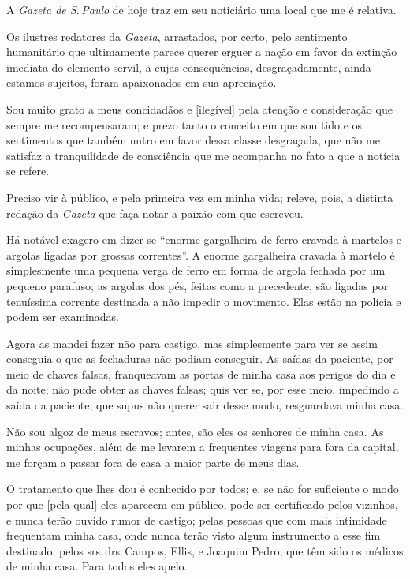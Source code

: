 {A \emph{Gazeta de S.\,Paulo} de hoje traz em seu noticiário uma local que
me é relativa.

Os ilustres redatores da \emph{Gazeta}, arrastados, por certo, pelo
sentimento humanitário que ultimamente parece querer erguer a nação em
favor da extinção imediata do elemento servil, a cujas consequências,
desgraçadamente, ainda estamos sujeitos, foram apaixonados em sua
apreciação.

Sou muito grato a meus concidadãos e {[}ilegível{]} pela atenção e
consideração que sempre me recompensaram; e prezo tanto o conceito em
que sou tido e os sentimentos que também nutro em favor dessa classe
desgraçada, que não me satisfaz a tranquilidade de consciência que me
acompanha no fato a que a notícia se refere.

Preciso vir à público, e pela primeira vez em minha vida; releve, pois,
a distinta redação da \emph{Gazeta} que faça notar a paixão com que
escreveu.

Há notável exagero em dizer-se ``enorme gargalheira de ferro cravada à
martelos e argolas ligadas por grossas correntes''. A enorme gargalheira
cravada à martelo é simplesmente uma pequena verga de ferro em forma de
argola fechada por um pequeno parafuso; as argolas dos pés, feitas como
a precedente, são ligadas por tenuíssima corrente destinada a não impedir
o movimento. Elas estão na polícia e podem ser examinadas.

Agora as mandei fazer não para castigo, mas simplesmente para ver se
assim conseguia o que as fechaduras não podiam conseguir. As saídas da
paciente, por meio de chaves falsas, franqueavam as portas de minha casa
aos perigos do dia e da noite; não pude obter as chaves falsas; quis ver
se, por esse meio, impedindo a saída da paciente, que supus não querer
sair desse modo, resguardava minha casa.

Não sou algoz de meus escravos; antes, são eles os senhores de minha
casa. As minhas ocupações, além de me levarem a frequentes viagens para
fora da capital, me forçam a passar fora de casa a maior parte de meus
dias.

O tratamento que lhes dou é conhecido por todos; e, se não for
suficiente o modo por que {[}pela qual{]} eles aparecem em público, pode
ser certificado pelos vizinhos, e nunca terão ouvido rumor de castigo;
pelas pessoas que com mais intimidade frequentam minha casa, onde nunca
terão visto algum instrumento a esse fim destinado; pelos srs.\,drs.\,Campos, Ellis, e Joaquim Pedro, que têm sido os médicos de minha casa.
Para todos eles apelo.

}
